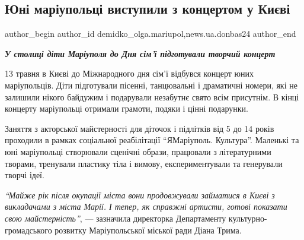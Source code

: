  
 
 
 
 
 
\subsection{Юні маріупольці виступили з концертом у Києві}
\label{sec:15_05_2023.stz.news.ua.donbas24.2.juni_mrplci_koncert_kyiv}
 
\ifcmt
 author_begin
   author_id demidko_olga.mariupol,news.ua.donbas24
 author_end
\fi


\begin{center}
  \em\color{blue}\bfseries\Large
У столиці діти Маріуполя до Дня сім'ї підготували творчий концерт
\end{center}

13 травня в Києві до Міжнародного дня сім'ї відбувся концерт юних маріупольців.
Діти підготували пісенні, танцювальні і драматичні номери, які не залишили
нікого байдужим і подарували незабутнє свято всім присутнім. В кінці концерту
маріупольці отримали грамоти, подяки і цінні подарунки.


Заняття з акторської майстерності для діточок і підлітків від 5 до 14 років
проходили в рамках соціальної реабілітації \enquote{ЯМаріуполь. Культура}. Маленькі та
юні маріупольці створювали сценічні образи, працювали з літературними творами,
тренували пластику тіла і вимову, експериментували та генерували творчі ідеї.

\begin{leftbar}
\emph{\enquote{Майже рік після окупації міста вони продовжували займатися в Києві з
викладачами з міста Марії. І тепер, як справжні артисти, готові показати свою
майстерність}}, — зазначила директорка Департаменту культурно-громадського
розвитку Маріупольської міської ради Діана Трима.
\end{leftbar}

